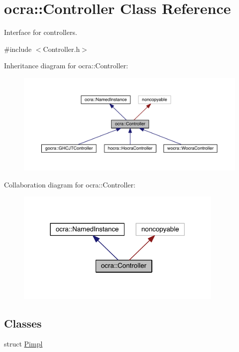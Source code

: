 \hypertarget{classocra_1_1Controller}{}\section{ocra\+:\+:Controller Class Reference}
\label{classocra_1_1Controller}


Interface for controllers.  




{\ttfamily \#include $<$Controller.\+h$>$}



Inheritance diagram for ocra\+:\+:Controller\+:\nopagebreak
\begin{figure}[H]
\begin{center}
\leavevmode
\includegraphics[width=350pt]{dc/d26/classocra_1_1Controller__inherit__graph}
\end{center}
\end{figure}


Collaboration diagram for ocra\+:\+:Controller\+:\nopagebreak
\begin{figure}[H]
\begin{center}
\leavevmode
\includegraphics[width=282pt]{dc/dfe/classocra_1_1Controller__coll__graph}
\end{center}
\end{figure}
\subsection*{Classes}
\begin{DoxyCompactItemize}
\item 
struct \hyperlink{structocra_1_1Controller_1_1Pimpl}{Pimpl}
\end{DoxyCompactItemize}
